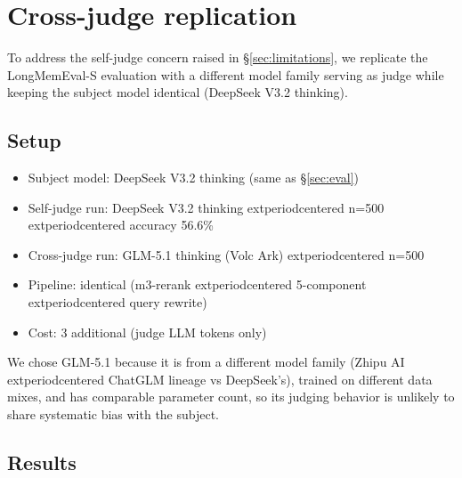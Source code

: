 
\section{Cross-judge replication}
\label{app:crossjudge}

To address the self-judge concern raised in §\ref{sec:limitations}, we
replicate the LongMemEval-S evaluation with a different model family
serving as judge while keeping the subject model identical (DeepSeek
V3.2 thinking).

\subsection{Setup}

\begin{itemize}
\item Subject model: DeepSeek V3.2 thinking (same as §\ref{sec:eval})
\item Self-judge run: DeepSeek V3.2 thinking 	extperiodcentered{}  n=500 	extperiodcentered{}  accuracy 56.6\%
\item Cross-judge run: GLM-5.1 thinking (Volc Ark) 	extperiodcentered{}  n=500
\item Pipeline: identical (m3-rerank 	extperiodcentered{}  5-component 	extperiodcentered{}  query rewrite)
\item Cost: \cny{}3 additional (judge LLM tokens only)
\end{itemize}

We chose GLM-5.1 because it is from a different model family
(Zhipu AI 	extperiodcentered{}  ChatGLM lineage vs DeepSeek's), trained on different data
mixes, and has comparable parameter count, so its judging behavior is
unlikely to share systematic bias with the subject.

\subsection{Results}

